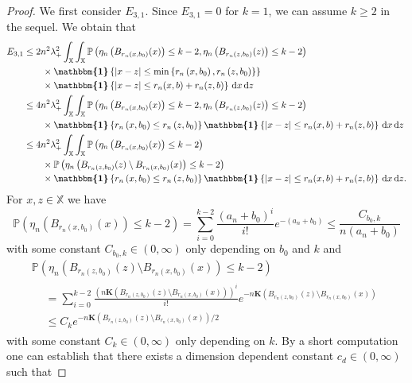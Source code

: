 \documentclass[10pt]{amsart}
\theoremstyle{definition}\newtheorem{defi}[theo]{Definition}\newtheorem{rema}[theo]{Remark}\newtheorem{exam}[theo]{Example}\newtheorem{exem}[theo]{Example}\newtheorem{nota}[theo]{Notation}
\newcommand*\bK{\mathbf{K}}
\renewcommand*\P{\mathbb{P}}
\newcommand*\X{\mathbb{X}}
\newcommand*\md{\mathrm{d}}
\newcommand{\ind}{\boldsymbol{\mathbbm{1}}}
\newcommand{\set}[1]{\left\{#1\right\}}
\newcommand{\prob}[1]{\P\left(#1\right)}
\begin{document}
\begin{proof}
We first consider $E_{3,1}$. Since $E_{3,1}=0$ for $k=1$, we can assume $k\geq 2$ in the sequel. We obtain that
\begin{align*}
E_{3,1} & \leq {2} n^2 \lambda_+^2 \int_{\X}\int_{\X} \prob{\eta_n \left(B_{r_n\left(x,b_0\right)}(x)\right) \leq k-2, \eta_n \left(B_{r_n\left(z,b_0\right)}(z)\right) \leq k-2} \\
& \qquad \times \ind\set{|x-z|\leq \min
\left\{r_n\left(x,b_0\right),r_n\left(z,b_0\right)\right\}}\\
&\qquad \times  \ind\set{|x-z| \leq r_n(x,b) + r_n(z,b)} \, \md x \, \md z \\
& \leq {4} n^2 \lambda_+^2 \int_{\X}\int_{\X} \prob{\eta_n \left(B_{r_n\left(x,b_0\right)}(x)\right) \leq k-2, \eta_n \left(B_{r_n\left(z,b_0\right)}(z)\right) \leq k-2} \\
& \qquad\times \ind\set{r_n\left(x,b_0\right) \leq r_n\left(z,b_0\right)} \ind\set{|x-z| \leq r_n(x,b) + r_n(z,b)} \, \md x \, \md z \\
& \leq {4} n^2 \lambda_+^2 \int_{\X}\int_{\X} \prob{\eta_n \left(B_{r_n\left(x,b_0\right)}(x)\right) \leq k-2} \\
&\qquad \times\prob{\eta_n \left(B_{r_n\left(z,b_0\right)}(z)\setminus B_{r_n\left(x,b_0\right)}(x)\right) \leq k-2} \\
& \qquad\times \ind\set{r_n\left(x,b_0\right) \leq r_n\left(z,b_0\right)} \ind\set{|x-z| \leq r_n(x,b) + r_n(z,b)} \, \md x \, \md z.
\end{align*}
For $x,z\in\X$ we have
\[
\prob{\eta_n \left(B_{r_n\left(x,b_0\right)}(x)\right) \leq k-2} =\sum_{i=0}^{k-2} \frac{\left(a_n+b_0\right)^i}{i!} e^{-\left(a_n+b_0\right)} \leq \frac{C_{b_0,k}}{n\left(a_n+b_0\right)}
\]
with some constant $C_{b_0,k}\in (0,\infty)$ only depending on $b_0$ and $k$ and
\begin{multline*}
 \prob{ \eta_n \left(B_{r_n\left(z,b_0\right)}(z)\setminus B_{r_n\left(x,b_0\right)}(x)\right) \leq k-2} \\
\begin{aligned}
& = \sum_{i=0}^{k-2} \frac{\left(n\bK\left(B_{r_n\left(z,b_0\right)}(z)\setminus B_{r_n\left(x,b_0\right)}(x)\right)\right)^i}{i!} e^{-n\bK\left(B_{r_n\left(z,b_0\right)}(z)\setminus B_{r_n\left(x,b_0\right)}(x)\right)} \\
& \leq C_k e^{-n\bK\left(B_{r_n\left(z,b_0\right)}(z)\setminus B_{r_n\left(x,b_0\right)}(x)\right)/2}
\end{aligned}
\end{multline*}
with some constant $C_k\in(0,\infty)$ only depending on $k$. By a short computation one can establish that there exists a dimension dependent constant $c_d\in(0,\infty)$ such that

\end{proof}
\end{document}
